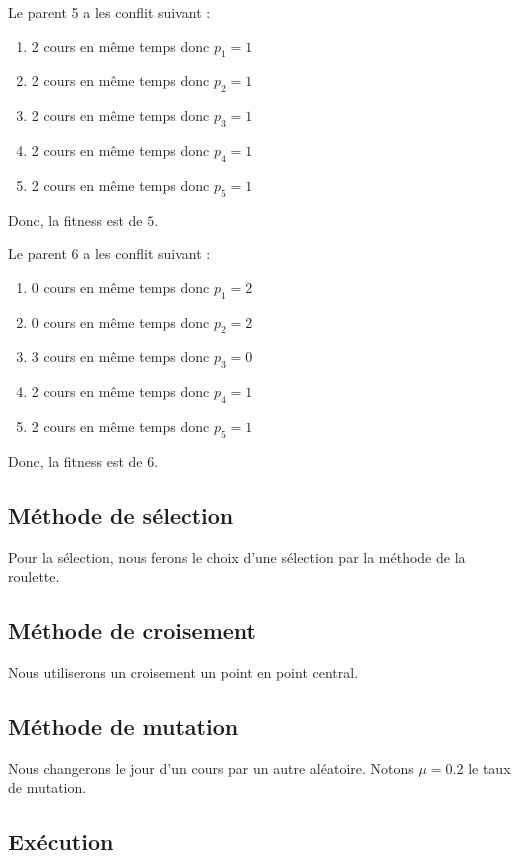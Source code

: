 Le parent 5 a les conflit suivant :
\begin{enumerate}
    \item 2 cours en même temps donc $p_1 = 1$
    \item 2 cours en même temps donc $p_2 = 1$
    \item 2 cours en même temps donc $p_3 = 1$
    \item 2 cours en même temps donc $p_4 = 1$
    \item 2 cours en même temps donc $p_5 = 1$
\end{enumerate}
Donc, la fitness est de $5$.

Le parent 6 a les conflit suivant :
\begin{enumerate}
    \item 0 cours en même temps donc $p_1 = 2$
    \item 0 cours en même temps donc $p_2 = 2$
    \item 3 cours en même temps donc $p_3 = 0$
    \item 2 cours en même temps donc $p_4 = 1$
    \item 2 cours en même temps donc $p_5 = 1$
\end{enumerate}
Donc, la fitness est de $6$.

\subsection{Méthode de sélection}\label{subsec:methode-de-selection}

Pour la sélection, nous ferons le choix d'une sélection par la méthode de la roulette.

\subsection{Méthode de croisement}\label{subsec:methode-de-croisement}

Nous utiliserons un croisement un point en point central.

\subsection{Méthode de mutation}\label{subsec:methode-de-mutation}

Nous changerons le jour d'un cours par un autre aléatoire.
Notons $\mu = 0.2$ le taux de mutation.

\subsection{Exécution}\label{subsec:execution}

